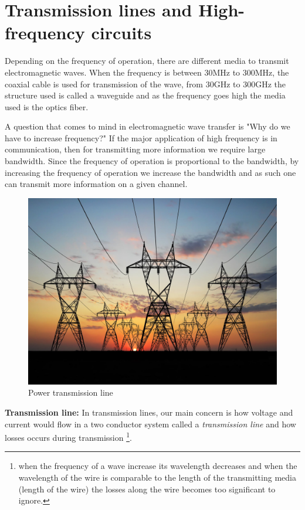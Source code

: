 \section{Transmission lines and High-frequency circuits}

Depending on the frequency of operation, there are different media to transmit electromagnetic waves. When the frequency is between 30MHz to 300MHz, the coaxial cable is used for transmission of the wave, from 30GHz to 300GHz the structure used is called a waveguide and as the frequency goes high the media used is the optics fiber.

A question that comes to mind in electromagnetic wave transfer is "Why do we have to increase frequency?" If the major application of high frequency is in communication, then for transmitting more information we require large bandwidth. Since the frequency of operation is proportional to the bandwidth, by increasing the frequency of operation we increase the bandwidth and as such one can transmit more information on a given channel.
\begin{figure}[h]
\centering
\includegraphics[scale=0.1]{./graphics/transmission2}
\caption{Power transmission line}
\end{figure}

\textbf{Transmission line:} In transmission lines, our main concern is how voltage and current would flow in a two conductor system called a \textit{transmission line} and how losses occurs during transmission \footnote{when the frequency of a wave increase its wavelength decreases and when the wavelength of the wire is comparable to the length of the transmitting media (length of the wire) the losses along the wire becomes too significant to ignore.}.

